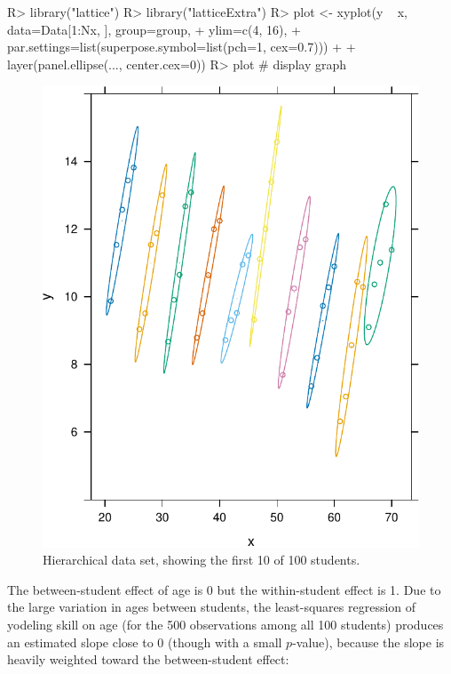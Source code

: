 \documentclass[
]{jss}
\begin{document}
\begin{CodeChunk}
\begin{CodeInput}
R> library("lattice")
R> library("latticeExtra")
R> plot <- xyplot(y ~ x, data=Data[1:Nx, ], group=group,
+                ylim=c(4, 16),
+                par.settings=list(superpose.symbol=list(pch=1, cex=0.7))) +
+     layer(panel.ellipse(..., center.cex=0))
R> plot # display graph
\end{CodeInput}
\begin{figure}

{\centering \includegraphics[width=1\linewidth]{JSS-article_files/figure-latex/plot1-1} 

}

\caption[Hierarchical data set, showing the first 10 of 100 students]{Hierarchical data set, showing the first 10 of 100 students.}\label{fig:plot1}
\end{figure}
\end{CodeChunk}

The between-student effect of age is 0 but the within-student effect is
1. Due to the large variation in ages between students, the
least-squares regression of yodeling skill on age (for the 500
observations among all 100 students) produces an estimated slope close
to 0 (though with a small \(p\)-value), because the slope is heavily
weighted toward the between-student effect:
\end{document}
